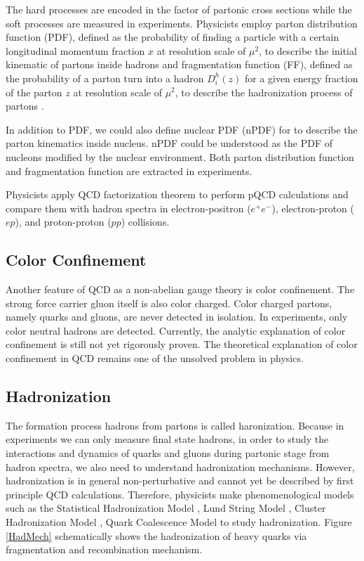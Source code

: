 The hard processes are encoded in the factor of partonic cross sections while the soft processes are measured in experiments. Physicists employ parton distribution function (PDF), defined as the probability of finding a particle with a certain longitudinal momentum fraction $x$ at resolution scale of $\mu^2$, to describe the initial kinematic of partons inside hadrons \cite{PDFRef} and fragmentation function (FF), defined as the probability of a parton turn into a hadron $D_i^h(z)$ for a given energy fraction of the parton $z$ at resolution scale of $\mu^2$, to describe the hadronization process of partons \cite{QCDFFunc}. 

In addition to PDF, we could also define nuclear PDF (nPDF) for \cite{nPDFDef} to describe the parton kinematics inside nucleus. nPDF could be understood as the PDF of nucleons modified by the nuclear environment. Both parton distribution function and fragmentation function are extracted in experiments.

Physicists apply QCD factorization theorem to perform pQCD calculations and compare them with hadron spectra in electron-positron ($e^+e^-$), electron-proton ($ep$), and proton-proton ($pp$) collisions.

\subsection{Color Confinement}

Another feature of QCD as a non-abelian gauge theory is color confinement. The strong force carrier gluon itself is also color charged. Color charged partons, namely quarks and gluons, are never detected in isolation. In experiments, only color neutral hadrons are detected. Currently, the analytic explanation of color confinement is still not yet rigorously proven. The theoretical explanation of color confinement in QCD remains one of the unsolved problem in physics. 

\subsection{Hadronization}

The formation process hadrons from partons is called haronization. Because in experiments we can only measure final state hadrons, in order to study the interactions and dynamics of quarks and gluons during partonic stage from hadron spectra, we also need to understand hadronization mechanisms. However, hadronization is in general non-perturbative and cannot yet be described by first principle QCD calculations. Therefore, physicists make phenomenological models such as the Statistical Hadronization Model \cite{SHM}, Lund String Model \cite{LSM}, Cluster Hadronization Model \cite{CHM}, Quark Coalescence Model \cite{QCM} to study hadronization. Figure \ref{HadMech} schematically shows the hadronization of heavy quarks via fragmentation and recombination mechanism.

